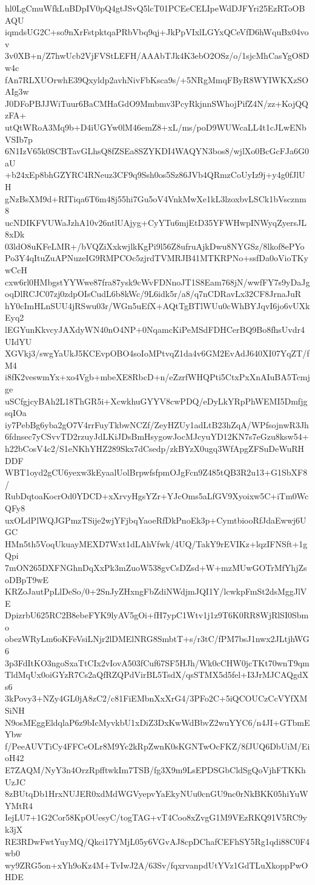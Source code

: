 hl0LgCmuWfkLuBDpIV0pQ4gtJSvQ5lcT01PCEeCELIpeWdDJFYri25EzRToOBAQU
iqmdsUG2C+so9nXrFstpktqaPRbVbq9qj+JkPpVIxlLGYxQCeVfD6hWquBx04vov
3v0XB+n/Z7hwUcb2VjFVStLEFH/AAAbTJk4K3ebO2OSz/o/1sjcMhCasYgO8Dw4c
fAn7RLXUOrwhE39Qxyldp2avhNivFbKsca9s/+5NRgMmqFByR8WYIWKXzSOAIg3w
J0DFoPBJJWiTuur6BaCMHaGdO9Mmbmv3PcyRkjnnSWhojPifZ4N/zz+KojQQzFA+
utQtWRoA3Mq9b+D4iUGYw0lM46emZ8+xL/ms/poD9WUWcaLL4t1cJLwENbVSIb7p
6N1IzV65k0SCBTavGLhsQ8fZSEa8SZYKDI4WAQYN3bos8/wjlXo0BcGcFJa6G0aU
+b24xEp8bhGZYRC4RNeuz3CF9q9Ssh0os5Sz86JVb4QRmzCoUyIz9j+y4g0fJlUH
gNzBsXM9d+RITiqa6T6m48j55hi7Gu5oV4VnkMwXe1kL3lzoxbvLSCk1bVscznm8
ucNDIKFVUWaJzhA10v26ntlUAjyg+CyYTu6mjEtD35YFWHwpINWyqZyersJL8xDk
03ldO8uKFeLMR+/bVQZiXxkwjlkKgPi9l56Z8ufruAjkDwu8NYGSz/8lkof8ePYo
Po3Y4qItuZuAPNuzeIG9RMPCOc5zjrdTVMRJB41MTKRPNo+ssfDa0oVioTKywCcH
cxw6rl0HMbgstYYWwe87fra87ysk9cWvFDNnoJT1S8Eam768jN/wwfFY7s9yDaJg
oqDlRCJC07zj0zdpOIsCudL6b8kWc/9L6idk5r/a8/q7nCDRavLx32CF8JrnaJuR
hY0cImHLnSUU4jRSwu03r/WGn5uEfX+AQtTgBTlWUu0cWhBYJqvI6jo6vUXkEyq2
lEGYunKkvcyJAXdyWN40nO4NP+0NqamcKiPeMSdFDHCerBQ9Bo8fhsUvdr4UIdYU
XGVkj3/swgYaUkJ5KCEvpOBO4soIoMPtvqZ1da4v6GM2EvAdJ640XI07YqZT/fM4
i8fK2veswmYx+xo4Vgb+mbeXE8RbcD+n/eZzrfWHQPti5CtxPxXnAIuBA5Tcmjge
uSCfgjcyBAh2L18ThGR5i+XcwkhuGYYV8cwPDQ/eDyLkYRpPhWEMI5DmfjgsqIOa
iy7PebBg6yba2gO7V4rrFuyTkbwNCZf/ZeyHZUy1adLtB23hZqA/WPfsojnwR3Jh
6fdnsec7yCSvvTD2rzuyJdLKiJDsBmHsygowJocMJcyuYD12KN7s7eGzu8ksw54+
h22bCosV4c2/S1eNKhYHZ289Skx7dCsedp/zkBYzX0ugq3WfApgZFSuDeWuRHDDF
WBT1oyd2gCU6yexw3kEyaalUolBrpwfsfpmOJgFcn9Z485tQB3R2u13+G1SbXF8/
RubDqtoaKocrOd0YDCD+xXrvyHgsYZr+YJcOms5aLfGV9Xyoixw5C+iTm0WcQFy8
uxOLdPlWQJGPmzTSije2wjYFjbqYaoeRfDkPnoEk3p+CymtbiooRfJdaEwwj6UGC
HMn5th5VoqUkuayMEXD7Wxt1dLAhVfwk/4UQ/TakY9rEVIKz+lqzIFNSft+1gQpi
7mON265DXFNGhnDqXxPk3mZuoW538gvCsDZsd+W+mzMUwGOTrMfYhjZsoDBpT9wE
KRZoJautPpLlDeSo/0+2SnJyZHxngFbZdiNWdjmJQI1Y/lcwkpFmSt2dsMggJlVE
DpizrbU625RC2B8ebeFYK9lyAV5gOi+fH7ypC1Wtv1j1z9T6K0RR8WjRlSI0Sbmo
obezWRyLm6oKFeVsiLNjr2lDMElNRG8SmbtT+s/r3tC/fPM7bsJ1nwx2JLtjhWG6
3p3FdItKO3ngoSxaTtCIx2vIovA503fCuf67SF5HJh/Wk0cCHW0jcTKt70wnT9qm
TldMqUx0oiGYzR7Cs2aQfRZQPdVirBL5TsdX/qsSTMX5d5fel+I3JrMJCAQgdXs6
3kPovy3+NZy4GL0jA8zC2/c81FiEMbnXxXrG4/3PFo2C+5iQCOUCzCcVYfXMSiNH
N9osMEggEldqlaP6z9bIcMyvkbU1xDiZ3DxKwWdBbvZ2wuYYC6/n4JI+GTbmEYbw
f/PeeAUVTiCy4FFCeOLr8M9Yc2kRpZwnK0sKGNTwOcFKZ/8fJUQ6DbUiM/EioH42
E7ZAQM/NyY3n4OrzRpfftwkIm7TSB/fg3X9m9LsEPDSGbCldSgQoVjhFTKKhUzJC
8zBUtqDb1HrxNUJER0xdMdWGVyepvYaEkyNUu0cnGU9nc0rNkBKK05hiYuWYMtR4
IejLU7+1G2Cor58KpOUesyC/togTAG+vT4Coo8xZvgG1M9VEzRKQ91V5RC9yk3jX
RE3RDwFwtYuyMQ/Qkci17YMjL05y6VGvAJ8cpDChafCEFhSY5Rg1qdi88C0F4wb0
wy9ZRG5on+xYh9oKz4M+TvIwJ2A/63Sv/fqxrvanpdUtYVz1GdTLuXkoppPwOHDE
